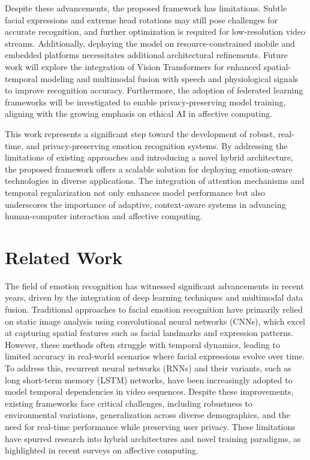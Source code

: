 \documentclass[conference]{IEEEtran}
\begin{document}
Despite these advancements, the proposed framework has limitations. Subtle facial expressions and extreme head rotations may still pose challenges for accurate recognition, and further optimization is required for low-resolution video streams. Additionally, deploying the model on resource-constrained mobile and embedded platforms necessitates additional architectural refinements. Future work will explore the integration of Vision Transformers for enhanced spatial-temporal modeling and multimodal fusion with speech and physiological signals to improve recognition accuracy. Furthermore, the adoption of federated learning frameworks will be investigated to enable privacy-preserving model training, aligning with the growing emphasis on ethical AI in affective computing.  

This work represents a significant step toward the development of robust, real-time, and privacy-preserving emotion recognition systems. By addressing the limitations of existing approaches and introducing a novel hybrid architecture, the proposed framework offers a scalable solution for deploying emotion-aware technologies in diverse applications. The integration of attention mechanisms and temporal regularization not only enhances model performance but also underscores the importance of adaptive, context-aware systems in advancing human-computer interaction and affective computing.

\section{Related Work}

The field of emotion recognition has witnessed significant advancements in recent years, driven by the integration of deep learning techniques and multimodal data fusion. Traditional approaches to facial emotion recognition have primarily relied on static image analysis using convolutional neural networks (CNNs), which excel at capturing spatial features such as facial landmarks and expression patterns. However, these methods often struggle with temporal dynamics, leading to limited accuracy in real-world scenarios where facial expressions evolve over time. To address this, recurrent neural networks (RNNs) and their variants, such as long short-term memory (LSTM) networks, have been increasingly adopted to model temporal dependencies in video sequences. Despite these improvements, existing frameworks face critical challenges, including robustness to environmental variations, generalization across diverse demographics, and the need for real-time performance while preserving user privacy. These limitations have spurred research into hybrid architectures and novel training paradigms, as highlighted in recent surveys on affective computing.  
\end{document}
